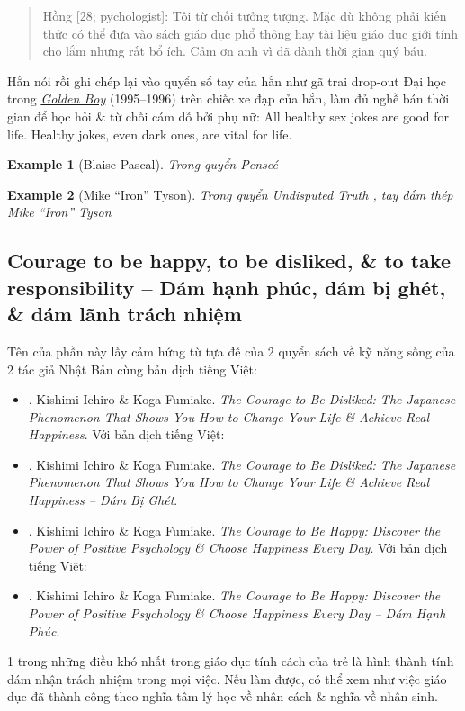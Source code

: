 \documentclass[12pt]{article}
\newtheorem{example}{Example}
\begin{document}
\begin{quotation}
	{\sf Hồng [28; pychologist]}: Tôi từ chối tưởng tượng. Mặc dù không phải kiến thức có thể đưa vào sách giáo dục phổ thông hay tài liệu giáo dục giới tính cho lắm nhưng rất bổ ích. Cảm ơn anh vì đã dành thời gian quý báu.
\end{quotation}
Hắn nói rồi ghi chép lại vào quyển sổ tay của hắn như gã trai drop-out Đại học trong \href{https://www.imdb.com/title/tt0159145/}{\it Golden Boy} (1995--1996) trên chiếc xe đạp của hắn, làm đủ nghề bán thời gian để học hỏi \& từ chối cám dỗ bởi phụ nữ: All healthy sex jokes are good for life. Healthy jokes, even dark ones, are vital for life.

\begin{example}[\sc Blaise Pascal]\rm
	Trong quyển {\it Pense\'e} \cite{Pascal2003}
\end{example}

\begin{example}[\sc Mike ``Iron'' Tyson]\rm
	Trong quyển {\it Undisputed Truth} \cite{Tyson_Sloman2013}, tay đấm thép Mike ``Iron'' Tyson
\end{example}

\subsection{Courage to be happy, to be disliked, \& to take responsibility -- Dám hạnh phúc, dám bị ghét, \& dám lãnh trách nhiệm}
Tên của phần này lấy cảm hứng từ tựa đề của 2 quyển sách về kỹ năng sống của 2 tác giả Nhật Bản cùng bản dịch tiếng Việt:
\begin{itemize}
	\item \cite{Ichiro_Fumitake_disliked}. {\sc Kishimi Ichiro \& Koga Fumiake}. {\it The Courage to Be Disliked: The Japanese Phenomenon That Shows You How to Change Your Life \& Achieve Real Happiness}. Với bản dịch tiếng Việt:
	\item \cite{Ichiro_Fumitake_disliked_VN}. {\sc Kishimi Ichiro \& Koga Fumiake}. {\it The Courage to Be Disliked: The Japanese Phenomenon That Shows You How to Change Your Life \& Achieve Real Happiness -- Dám Bị Ghét}.
	\item \cite{Ichiro_Fumitake_happy}. {\sc Kishimi Ichiro \& Koga Fumiake}. {\it The Courage to Be Happy: Discover the Power of Positive Psychology \& Choose Happiness Every Day}. Với bản dịch tiếng Việt:
	\item \cite{Ichiro_Fumitake_happy_VN}. {\sc Kishimi Ichiro \& Koga Fumiake}. {\it The Courage to Be Happy: Discover the Power of Positive Psychology \& Choose Happiness Every Day -- Dám Hạnh Phúc}.
\end{itemize}
1 trong những điều khó nhất trong giáo dục tính cách của trẻ là hình thành tính dám nhận trách nhiệm trong mọi việc. Nếu làm được, có thể xem như việc giáo dục đã thành công theo nghĩa tâm lý học về nhân cách \& nghĩa về nhân sinh.
\end{document}
